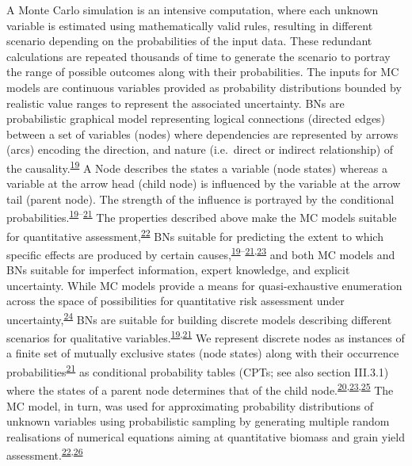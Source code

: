 \documentclass[11pt,preprint]{article}
\begin{document}
A Monte Carlo simulation is an intensive computation, where each unknown
variable is estimated using mathematically valid rules, resulting in
different scenario depending on the probabilities of the input data.
These redundant calculations are repeated thousands of time to generate
the scenario to portray the range of possible outcomes along with their
probabilities. The inputs for MC models are continuous variables
provided as probability distributions bounded by realistic value ranges
to represent the associated uncertainty. BNs are probabilistic graphical
model representing logical connections (directed edges) between a set of
variables (nodes) where dependencies are represented by arrows (arcs)
encoding the direction, and nature (i.e.~direct or indirect
relationship) of the
causality.\textsuperscript{\protect\hyperlink{ref-Pearl_1988}{19}} A
Node describes the states a variable (node states) whereas a variable at
the arrow head (child node) is influenced by the variable at the arrow
tail (parent node). The strength of the influence is portrayed by the
conditional
probabilities.\textsuperscript{\protect\hyperlink{ref-Pearl_1988}{19}--\protect\hyperlink{ref-Jensen_1996}{21}}
The properties described above make the MC models suitable for
quantitative
assessment,\textsuperscript{\protect\hyperlink{ref-Hubbard_2014}{22}}
BNs suitable for predicting the extent to which specific effects are
produced by certain
causes,\textsuperscript{\protect\hyperlink{ref-Pearl_1988}{19}--\protect\hyperlink{ref-Jensen_1996}{21},\protect\hyperlink{ref-Scutari_and_Denis_2015}{23}}
and both MC models and BNs suitable for imperfect information, expert
knowledge, and explicit uncertainty. While MC models provide a means for
quasi-exhaustive enumeration across the space of possibilities for
quantitative risk assessment under
uncertainty,\textsuperscript{\protect\hyperlink{ref-Rosenstock_et_al_2014}{24}}
BNs are suitable for building discrete models describing different
scenarios for qualitative
variables.\textsuperscript{\protect\hyperlink{ref-Pearl_1988}{19},\protect\hyperlink{ref-Jensen_1996}{21}}
We represent discrete nodes as instances of a finite set of mutually
exclusive states (node states) along with their occurrence
probabilities\textsuperscript{\protect\hyperlink{ref-Jensen_1996}{21}}
as conditional probability tables (CPTs; see also section III.3.1) where
the states of a parent node determines that of the child
node.\textsuperscript{\protect\hyperlink{ref-Fenton_and_Neil_2013}{20},\protect\hyperlink{ref-Scutari_and_Denis_2015}{23},\protect\hyperlink{ref-Jensen_and_Nielsen_2007}{25}}
The MC model, in turn, was used for approximating probability
distributions of unknown variables using probabilistic sampling by
generating multiple random realisations of numerical equations aiming at
quantitative biomass and grain yield
assessment.\textsuperscript{\protect\hyperlink{ref-Hubbard_2014}{22},\protect\hyperlink{ref-Luedeling_et_al_2015}{26}}
\end{document}
